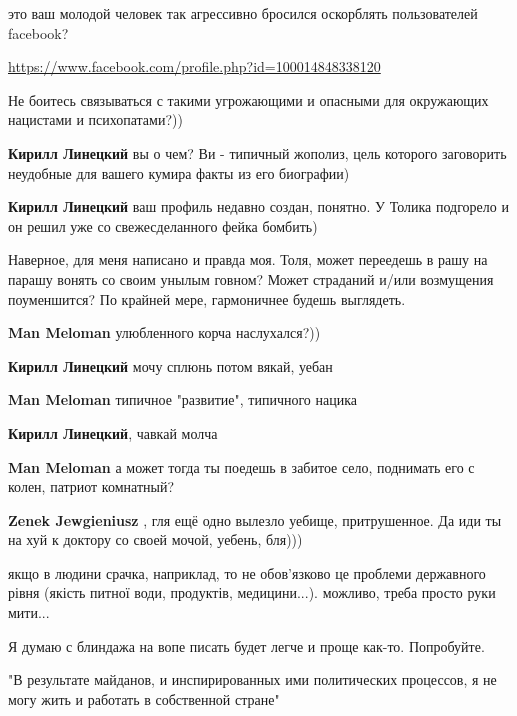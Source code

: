 \begin{itemize}
\begin{itemize}
это ваш молодой человек так агрессивно бросился оскорблять пользователей facebook? 

\url{https://www.facebook.com/profile.php?id=100014848338120}

Не боитесь связываться с такими угрожающими и опасными для окружающих нацистами
и психопатами?))

\textbf{Кирилл Линецкий} вы о чем? Ви - типичный жополиз, цель которого заговорить неудобные для вашего кумира факты из его биографии)

\textbf{Кирилл Линецкий} ваш профиль недавно создан, понятно. У Толика подгорело и он решил уже со свежесделанного фейка бомбить)
\end{itemize} %


Наверное, для меня написано и правда моя. Толя, может переедешь в рашу на
парашу вонять со своим унылым говном? Может страданий и/или возмущения
поуменшится? По крайней мере, гармоничнее будешь выглядеть.

\begin{itemize} %
\textbf{Man Meloman} улюбленного корча наслухался?))

\textbf{Кирилл Линецкий} мочу сплюнь потом вякай, уебан

\textbf{Man Meloman} типичное "развитие", типичного нацика

\textbf{Кирилл Линецкий}, чавкай молча

\textbf{Man Meloman} а может тогда ты поедешь в забитое село, поднимать его с колен, патриот комнатный?

\textbf{Zenek Jewgieniusz} , гля ещё одно вылезло уебище, притрушенное. Да иди ты на хуй к доктору со своей мочой, уебень, бля)))
\end{itemize} %


якщо в людини срачка, наприклад, то не обов’язково це проблеми державного рівня
(якість питної води, продуктів, медицини...). можливо, треба просто руки мити...

Я думаю с блиндажа на вопе писать будет легче и проще как-то. Попробуйте.


"В результате майданов, и инспирированных ими политических процессов, я не могу
жить и работать в собственной стране"


\end{itemize}
